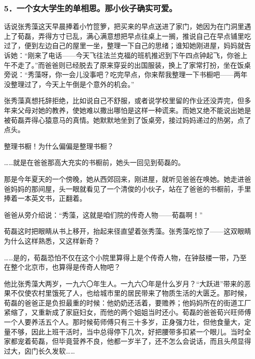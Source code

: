 \subsubsection*{5．一个女大学生的单相思。那小伙子确实可爱。}
\par 话说张秀藻这天早晨捧着小竹笸箩，把买来的早点送进了家门，她因为在门洞里遇上了荀磊，弄得方寸已乱，满心满意想把早点往桌上一搁，推说自己在早点铺里吃过了，便到左边自己的屋里一坐，整理一下自己的思绪；谁知她刚进屋，妈妈就告诉她：“刚来了电话——今天飞往法兰克福的班机推迟到下午四点钟起飞，你爸上午不走了。”而爸爸则已经脱去了原来穿妥的出国服装，换上了家常打扮，坐在饭桌旁说：“秀藻呀，你一会儿没事吧？吃完早点，你来帮我整理一下书橱吧——两年没整理过了，今天上午倒是个意外的机会。”
\par 张秀藻真想托辞拒绝，比如说自己不舒服，或者说学校里留的作业还没弄完，但多年来父母对她的教养，使她难以撒出哪怕是这样一种谎来。而她又绝不能说出她是被荀磊弄得心猿意马的真情。她默默地坐到了饭桌旁，接过妈妈递过的热粥，点了点头。
\par 整理书橱！为什么偏偏是整理书橱？
\par ……就是在爸爸那高大充实的书橱前，她头一回见到荀磊的。
\par 那是今年夏天的一个傍晚，她从西郊回来，刚进屋，就听见爸爸在唤她。她走进爸爸妈妈的那间屋，头一眼就看见了一个清俊的小伙子，站在了爸爸的书橱前，手里捧着一本英文书，正翻着。
\par 爸爸从旁介绍说：“秀藻，这就是咱们院的传奇人物——荀磊啊！”
\par 荀磊这时把眼睛从书上移开，抬起来径直望着张秀藻。张秀藻吃惊了——这双眼睛为什么这样熟悉，又这样新奇？
\par ……是的，荀磊恐怕不仅在这个小院里算得上是个传奇人物，在钟鼓楼一带，乃至在整个北京市，也算得是传奇人物吧？
\par 他比张秀藻大两岁，一九六〇年生人。一九六〇年是什么岁月？“大跃进”带来的恶果不仅使农村里饿死了人，也给城市里的居民带来了物质生活的大匮乏。那时候，荀磊的爸爸正是负担最重的时候：他奶奶还活着，要赡养；他妈妈所在的街道工厂紧缩了，又重新成了家庭妇女，而他的两个姐姐当时还小。荀磊的爸爸荀兴旺师傅一个人要养活五个人。那时候荀师傅只有三十多岁，正身强力壮，但他食量大，定量不够，因此上班干活时，当中总得停下几次，好把腰带多扣紧一个眼儿。当时全家都宠着荀磊，但毕竟营养不良，他都一岁半了，还不怎么会说话，而且头颅显得过大，囟门长久发软……
